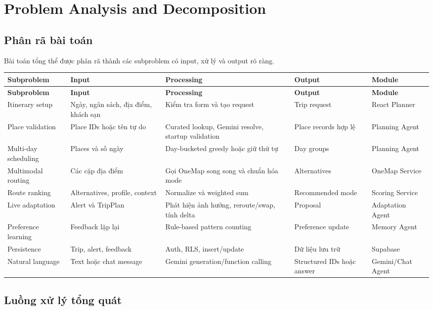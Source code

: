 \chapter{Problem Analysis and Decomposition}

\section{Phân rã bài toán}

Bài toán tổng thể được phân rã thành các subproblem có input, xử lý và output rõ ràng.

\begin{longtable}{p{3cm}p{3cm}p{4.5cm}p{3cm}p{3cm}}
\toprule
\textbf{Subproblem} & \textbf{Input} & \textbf{Processing} & \textbf{Output} & \textbf{Module} \\
\midrule
\endfirsthead
\toprule
\textbf{Subproblem} & \textbf{Input} & \textbf{Processing} & \textbf{Output} & \textbf{Module} \\
\midrule
\endhead
Itinerary setup & Ngày, ngân sách, địa điểm, khách sạn & Kiểm tra form và tạo request & Trip request & React Planner \\
Place validation & Place IDs hoặc tên tự do & Curated lookup, Gemini resolve, startup validation & Place records hợp lệ & Planning Agent \\
Multi-day scheduling & Places và số ngày & Day-bucketed greedy hoặc giữ thứ tự & Day groups & Planning Agent \\
Multimodal routing & Các cặp địa điểm & Gọi OneMap song song và chuẩn hóa mode & Alternatives & OneMap Service \\
Route ranking & Alternatives, profile, context & Normalize và weighted sum & Recommended mode & Scoring Service \\
Live adaptation & Alert và TripPlan & Phát hiện ảnh hưởng, reroute/swap, tính delta & Proposal & Adaptation Agent \\
Preference learning & Feedback lặp lại & Rule-based pattern counting & Preference update & Memory Agent \\
Persistence & Trip, alert, feedback & Auth, RLS, insert/update & Dữ liệu lưu trữ & Supabase \\
Natural language & Text hoặc chat message & Gemini generation/function calling & Structured IDs hoặc answer & Gemini/Chat Agent \\
\bottomrule
\end{longtable}

\section{Luồng xử lý tổng quát}

